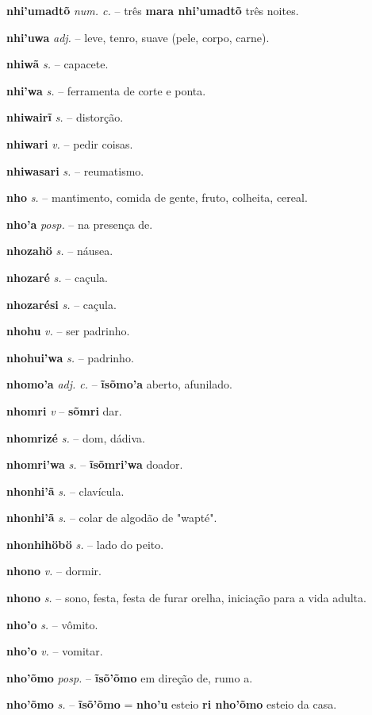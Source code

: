 \textbf{nhi'umadtõ} \textit{num. c.} -- três  \textbf{mara nhi'umadtõ} três noites.

\textbf{nhi'uwa} \textit{adj.} -- leve, tenro, suave (pele, corpo, carne).

\textbf{nhiwã} \textit{s.} -- capacete.

\textbf{nhi'wa} \textit{s.} -- ferramenta de corte e ponta.

\textbf{nhiwairĩ} \textit{s.} -- distorção.

\textbf{nhiwari} \textit{v.} -- pedir coisas.

\textbf{nhiwasari} \textit{s.} -- reumatismo.

\textbf{nho} \textit{s.} -- mantimento, comida de gente, fruto, colheita, cereal.

\textbf{nho'a} \textit{posp.} -- na presença de.

\textbf{nhozahö} \textit{s.} -- náusea.

\textbf{nhozaré} \textit{s.} -- caçula.

\textbf{nhozarési} \textit{s.} -- caçula.

\textbf{nhohu} \textit{v.} -- ser padrinho.

\textbf{nhohui'wa} \textit{s.} -- padrinho.

\textbf{nhomo'a} \textit{adj. c.} -- \textbf{ĩsõmo'a} aberto, afunilado.

\textbf{nhomri} \textit{v} -- \textbf{sõmri} dar.

\textbf{nhomrizé} \textit{s.} -- dom, dádiva.

\textbf{nhomri'wa} \textit{s.} -- \textbf{ĩsõmri'wa} doador.

\textbf{nhonhi'ã} \textit{s.} -- clavícula.

\textbf{nhonhi'ã} \textit{s.} -- colar de algodão de "wapté".

\textbf{nhonhihöbö} \textit{s.} -- lado do peito.

\textbf{nhono} \textit{v.} -- dormir.

\textbf{nhono} \textit{s.} -- sono, festa, festa de furar orelha, iniciação para a vida adulta.

\textbf{nho'o} \textit{s.} -- vômito.

\textbf{nho'o} \textit{v.} -- vomitar.

\textbf{nho'õmo} \textit{posp.} -- \textbf{ĩsõ'õmo} em direção de, rumo a.

\textbf{nho'õmo} \textit{s.} -- \textbf{ĩsõ'õmo} = \textbf{nho'u} esteio  \textbf{ri nho'õmo} esteio da casa.

